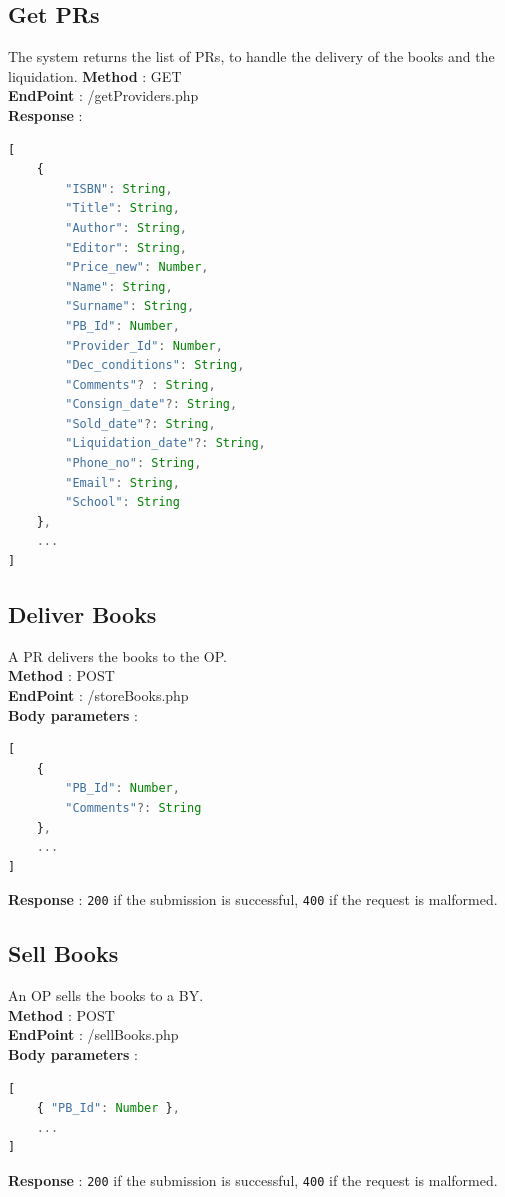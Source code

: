 \subsection{Get PRs}
The system returns the list of PRs, to handle the delivery of the books and the liquidation.
\textbf{Method} : GET \\
\textbf{EndPoint} : /getProviders.php \\
\textbf{Response} :
\begin{lstlisting}[language=JavaScript, label={lst:jscode}, basicstyle=\ttfamily]
[
    {
        "ISBN": String,
        "Title": String,
        "Author": String,
        "Editor": String,
        "Price_new": Number,
        "Name": String,
        "Surname": String,
        "PB_Id": Number,
        "Provider_Id": Number,
        "Dec_conditions": String,
        "Comments"? : String,
        "Consign_date"?: String,
        "Sold_date"?: String,
        "Liquidation_date"?: String,
        "Phone_no": String,
        "Email": String,
        "School": String
    },
    ...
]
\end{lstlisting}

\subsection{Deliver Books}
A PR delivers the books to the OP.\\
\textbf{Method} : POST \\
\textbf{EndPoint} : /storeBooks.php \\
\textbf{Body parameters} :
\begin{lstlisting}[language=JavaScript, label={lst:jscode}, basicstyle=\ttfamily]
[
    {
        "PB_Id": Number,
        "Comments"?: String
    },
    ...
]
\end{lstlisting}
\textbf{Response} : \texttt{200} if the submission is successful, \texttt{400} if the request is malformed.

\subsection{Sell Books}
An OP sells the books to a BY.\\
\textbf{Method} : POST \\
\textbf{EndPoint} : /sellBooks.php \\
\textbf{Body parameters} :
\begin{lstlisting}[language=JavaScript, label={lst:jscode}, basicstyle=\ttfamily]
[
    { "PB_Id": Number },
    ...
]
\end{lstlisting}
\textbf{Response} : \texttt{200} if the submission is successful, \texttt{400} if the request is malformed.

